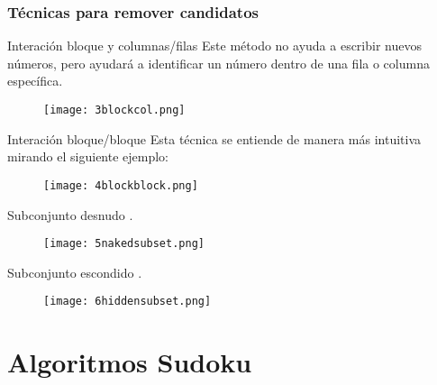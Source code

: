 \documentclass{beamer}
\begin{document}
\begin{frame}
\frametitle{Técnicas para remover candidatos}
\begin{block}{Interación bloque y columnas/filas}
Este método no ayuda a escribir nuevos números, pero ayudará a identificar un número dentro de una fila o columna específica.
\end{block}
\begin{figure}[H]
  \centering
  \texttt{[image: 3blockcol.png]}
\end{figure}
\end{frame}


\begin{frame}
\begin{block}{Interación bloque/bloque}
Esta técnica se entiende de manera más intuitiva mirando el siguiente ejemplo:
\end{block}
\begin{figure}[H]
  \centering
  \texttt{[image: 4blockblock.png]}
\end{figure}
\end{frame}


\begin{frame}
\begin{block}{Subconjunto desnudo}
.
\end{block}
\begin{figure}[H]
  \centering
  \texttt{[image: 5nakedsubset.png]}
\end{figure}
\end{frame}


\begin{frame}
\begin{block}{Subconjunto escondido}
.
\end{block}
\begin{figure}[H]
  \centering
  \texttt{[image: 6hiddensubset.png]}
\end{figure}
\end{frame}

\section{Algoritmos Sudoku}
\end{document}

